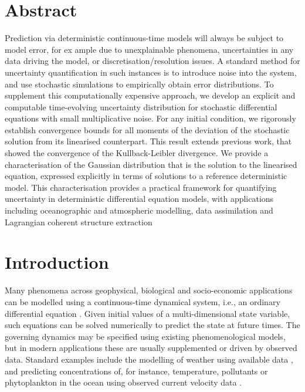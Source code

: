 \section{Abstract}\label{sec:paper1_abstract}
Prediction via deterministic continuous-time models will always be subject to model error, for ex ample due to unexplainable phenomena, uncertainties in any data driving the model, or discretisation/resolution issues.
A standard method for uncertainty quantification in such instances is to introduce noise into the system, and use stochastic simulations to empirically obtain error distributions.
To supplement this computationally expensive approach, we develop an explicit and computable time-evolving uncertainty distribution for stochastic differential equations with small multiplicative noise.
For any initial condition, we rigorously establish convergence bounds for all moments of the deviation of the stochastic solution from its linearised counterpart.
This result extends previous work, that showed the convergence of the Kullback-Leibler divergence. We provide a characterisation of the Gaussian distribution that is the solution to the linearised equation, expressed explicitly in terms of solutions to a reference deterministic model.
This characterisation provides a practical framework for quantifying uncertainty in deterministic differential equation models, with applications including oceanographic and atmospheric modelling, data assimilation and Lagrangian coherent structure extraction

\section{Introduction}\label{sec:paper1_intro}
Many phenomena across geophysical, biological and socio-economic applications can be modelled using a continuous-time dynamical system, i.e., an ordinary differential equation \cite[e.g.]{BrauerCastillo-Chavez_2012_MathematicalModelsPopulation,TelEtAl_2005_ChemicalBiologicalActivity,Wiggins_2005_DynamicalSystemsApproach}.
Given initial values of a multi-dimensional state variable, such equations can be solved numerically to predict the state at future times.
The governing dynamics may be specified using existing phenomenological models, but in modern applications these are usually supplemented or driven by observed data.
Standard examples include the modelling of weather using available data \cite{LawEtAl_2015_DataAssimilationMathematical,ReichCotter_2015_ProbabilisticForecastingBayesian}, and predicting concentrations of, for instance, temperature, pollutants or phytoplankton in the ocean using observed current velocity data \cite{AbascalEtAl_2009_ApplicationHFRadar,dOvidioEtAl_2010_FluidDynamicalNiches}.

